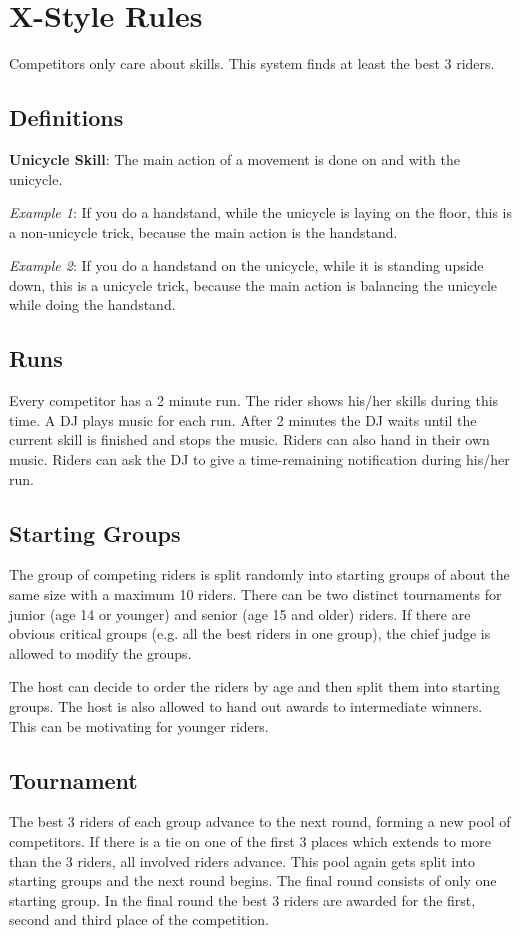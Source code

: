 \chapter{X-Style Rules}
Competitors only care about skills.
This system finds at least the best 3 riders.

\section{Definitions}

\textbf{Unicycle Skill}: The main action of a movement is done on and with the unicycle.

\textit{Example 1}: If you do a handstand, while the unicycle is laying on the floor, this is a non-unicycle trick, because the main action is the handstand.

\textit{Example 2}: If you do a handstand on the unicycle, while it is standing upside down, this is a unicycle trick, because the main action is balancing the unicycle while doing the handstand.

\section{Runs}
Every competitor has a 2 minute run.
The rider shows his/her skills during this time.
A DJ plays music for each run.
After 2 minutes the DJ waits until the current skill is finished and stops the music. 
Riders can also hand in their own music.
Riders can ask the DJ to give a time-remaining notification during his/her run.

\section{Starting Groups}
The group of competing riders is split randomly into starting groups of about the same size with a maximum 10 riders.
There can be two distinct tournaments for junior (age 14 or younger) and senior (age 15 and older) riders.
If there are obvious critical groups (e.g. all the best riders in one group), the chief judge is allowed to modify the groups.

The host can decide to order the riders by age and then split them into starting groups.
The host is also allowed to hand out awards to intermediate winners.
This can be motivating for younger riders.

\section{Tournament}
The best 3 riders of each group advance to the next round, forming a new pool of competitors.
If there is a tie on one of the first 3 places which extends to more than the 3 riders, all involved riders advance.
This pool again gets split into starting groups and the next round begins.
The final round consists of only one starting group.
In the final round the best 3 riders are awarded for the first, second and third place of the competition.

